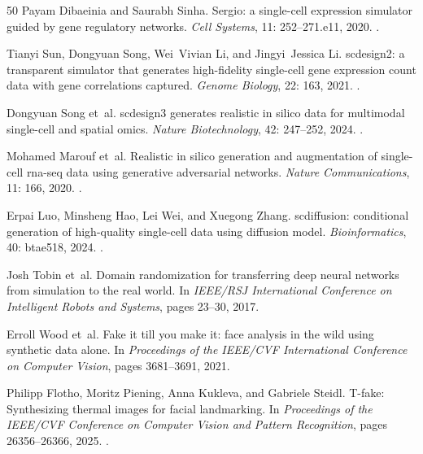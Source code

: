 \documentclass[12pt]{article}
\begin{document}
\begin{thebibliography}{50}
Payam Dibaeinia and Saurabh Sinha.
\newblock Sergio: a single-cell expression simulator guided by gene regulatory
  networks.
\newblock \emph{Cell Systems}, 11: 252--271.e11, 2020.
\newblock {}.

Tianyi Sun, Dongyuan Song, Wei~Vivian Li, and Jingyi~Jessica Li.
\newblock scdesign2: a transparent simulator that generates high-fidelity
  single-cell gene expression count data with gene correlations captured.
\newblock \emph{Genome Biology}, 22: 163, 2021.
\newblock {}.

Dongyuan Song et~al.
\newblock scdesign3 generates realistic in silico data for multimodal
  single-cell and spatial omics.
\newblock \emph{Nature Biotechnology}, 42: 247--252, 2024.
\newblock {}.

Mohamed Marouf et~al.
\newblock Realistic in silico generation and augmentation of single-cell
  rna-seq data using generative adversarial networks.
\newblock \emph{Nature Communications}, 11: 166, 2020.
\newblock {}.

Erpai Luo, Minsheng Hao, Lei Wei, and Xuegong Zhang.
\newblock scdiffusion: conditional generation of high-quality single-cell data
  using diffusion model.
\newblock \emph{Bioinformatics}, 40: btae518, 2024.
\newblock {}.

Josh Tobin et~al.
\newblock Domain randomization for transferring deep neural networks from
  simulation to the real world.
\newblock In \emph{IEEE/RSJ International Conference on Intelligent Robots and
  Systems}, pages 23--30, 2017.

Erroll Wood et~al.
\newblock Fake it till you make it: face analysis in the wild using synthetic
  data alone.
\newblock In \emph{Proceedings of the IEEE/CVF International Conference on
  Computer Vision}, pages 3681--3691, 2021.

Philipp Flotho, Moritz Piening, Anna Kukleva, and Gabriele Steidl.
\newblock T-fake: Synthesizing thermal images for facial landmarking.
\newblock In \emph{Proceedings of the IEEE/CVF Conference on Computer Vision
  and Pattern Recognition}, pages 26356--26366, 2025.
\newblock {}.


\end{thebibliography}
\end{document}
